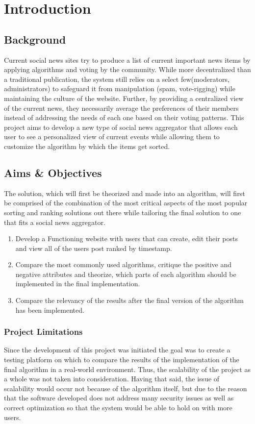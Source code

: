 
\chapter{Introduction}

\section{Background}
Current social news sites try to produce a list of current important news items by applying algorithms
and voting by the community. While more decentralized than a traditional publication, the system still
relies on a select few(moderators, administrators) to safeguard it from manipulation (spam, vote-rigging)
while maintaining the culture of the website. Further, by providing a centralized view of the current news,
they necessarily average the preferences of their members instead of addressing the needs of each one based on their voting patterns. This project aims to develop a new type of social news aggregator that allows each user to see a personalized view of current events while allowing them to customize the algorithm by which the items get sorted.

\section {Aims \& Objectives}
The solution, which will first be theorized and made into an algorithm, will first be comprised of the combination of the most critical aspects of the most popular sorting and ranking solutions out there while tailoring the final solution to one that fits a social news aggregator.

\begin{enumerate}
\item Develop a Functioning website with users that can create, edit their posts and view all of the users post ranked by timestamp.
\item Compare the most commonly used algorithms, critique the positive and negative attributes and theorize, which parts of each algorithm should be implemented in the final implementation.
\item Compare the relevancy of the results after the final version of the algorithm has been implemented.
\end{enumerate}

\subsection {Project Limitations}
Since the development of this project was initiated the goal was to create a testing platform
on which to compare the results of the implementation of the final algorithm in a real-world
environment. Thus, the scalability of the project as a whole was not taken into consideration. Having that said, the issue of scalability would occur not because of the algorithm itself, but
due to the reason that the software developed does not address many security issues as well as
correct optimization so that the system would be able to hold on with more users.


